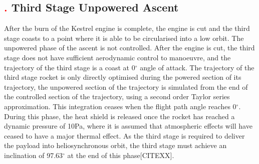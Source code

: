 \subsection{\textcolor{red}{.} Third Stage Unpowered Ascent}
After the burn of the Kestrel engine is complete, the engine is cut and the third stage coasts to a point where it is able to be circularised into a low orbit. 
The unpowered phase of the ascent is not controlled. After the engine is cut, the third stage does not have sufficient aerodynamic control to manoeuvre, and the trajectory of the third stage is a coast at 0$^\circ$ angle of attack. The trajectory of the third stage rocket is only directly optimised during the powered section of its trajectory, the unpowered section of the trajectory is simulated from the end of the controlled section of the trajectory, using a second order Taylor series approximation. This integration ceases when the flight path angle reaches 0$^{\circ}$.
During this phase, the heat shield is released once the rocket has reached a dynamic pressure of 10Pa, where it is assumed that atmospheric effects will have ceased to have a major thermal effect.  As the third stage is required to deliver the payload into heliosynchronous orbit, the third stage must achieve an inclination of 97.63$^\circ$ at the end of this phase[CITEXX].



